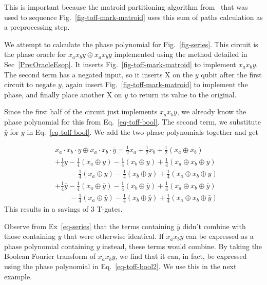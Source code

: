 This is important because the matroid partitioning algorithm from~\cite{bib-amy-matroid}
that was used to sequence Fig.~\ref{fig-toff-mark-matroid} uses this sum of paths
calculation as a preprocessing step. 

\begin{example}
  \label{ex-series}
  We attempt to calculate the phase polynomial for Fig.~\ref{fig-series}. This circuit
  is the phase oracle for $x_a x_b y \oplus x_a x_b \bar{y}$ implemented using
  the method detailed in Sec~\ref{Pre:OracleEsop}. It inserts
  Fig.~\ref{fig-toff-mark-matroid} to implement $x_a x_b y$. The second term has a negated
  input, so it inserts X on the $y$ qubit after the first circuit to negate $y$, again
  insert Fig.~\ref{fig-toff-mark-matroid} to implement the phase, and finally place another
  X on $y$ to return its value to the original.

  Since the first half of the circuit just implements $x_a x_b y$, we already know
  the phase polynomial for this from Eq.~\ref{eq-toff-bool}. The second term, we
  substitute $\bar{y}$ for $y$ in Eq.~\ref{eq-toff-bool}. We add the two phase
  polynomials together and get

  \begin{equation}
    \label{eq-series}
    \begin{aligned}
      &x_a \cdot x_b \cdot y \oplus x_a \cdot x_b \cdot \bar{y} = \frac{1}{2}x_a +
      \frac{1}{2}x_b +\frac{1}{2}(x_a \oplus x_b) \\
      & + \frac{1}{4}y -\frac{1}{4}(x_a \oplus y) - \frac{1}{4}(x_b \oplus y) +
      \frac{1}{4}(x_a \oplus x_b \oplus y)\\
      &\qquad -\frac{1}{4}(x_a \oplus y) - \frac{1}{4}(x_b \oplus y) +
      \frac{1}{4}(x_a \oplus x_b \oplus y)\\
      & + \frac{1}{4}\bar{y} -\frac{1}{4}(x_a \oplus \bar{y})
      - \frac{1}{4}(x_b \oplus \bar{y}) +
      \frac{1}{4}(x_a \oplus x_b \oplus \bar{y})\\
      &\qquad -\frac{1}{4}(x_a \oplus \bar{y}) - \frac{1}{4}(x_b \oplus \bar{y}) +
      \frac{1}{4}(x_a \oplus x_b \oplus \bar{y})
    \end{aligned}
  \end{equation}
  This results in a savings of 3 T-gates. 
\end{example}

Observe from Ex~\ref{eq-series} that the terms containing $\bar{y}$ didn't combine with
those containing $y$ that were otherwise identical. If $x_a x_b \bar{y}$ can be expressed
as a phase polynomial containing $y$ instead, these terms would combine. By taking the
Boolean Fourier transform of $x_a x_b \bar{y}$, we find that it can, in fact, be expressed
using the phase polynomial in Eq.~\ref{eq-toff-bool2}. We use this in the next example.


